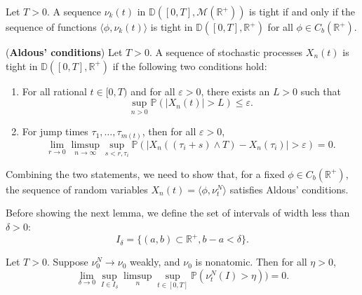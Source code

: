\begin{lem}\label{Cap}
Let $T>0$. A sequence $\nu_k(t)$ in $\mathbb D([0,T], \mathcal M(\mathbb{R}^+))$ is tight if and only if the sequence of functions $\langle \phi, \nu_k(t) \rangle$ is tight in $\mathbb D([0,T],\mathbb{R}^+)$ for all $\phi \in C_b(\mathbb R^+)$.
\end{lem}



\begin{theorem}\label{Ald}
 (\textbf{Aldous' conditions}) Let $T>0$. A sequence of stochastic processes $X_n(t)$ is tight in  $\mathbb D([0,T],\mathbb{R}^+)$ if the following two conditions hold:
\begin{enumerate}
\item For all rational $t \in [0,T)$ and for all $\varepsilon > 0$, there exists an $L>0$ such that
\begin{equation}
\sup_{n>0} \mathbb{P}(|X_n(t)|>L) \le \varepsilon.
\end{equation}
\item For jump times $\tau_1, \dots, \tau_{m(t)}$, then for all $\varepsilon >0$,
\begin{equation}
\lim_{r \rightarrow 0} \limsup_{n \rightarrow \infty} \sup_{s<r,\tau_{i}}  \mathbb P(|X_n((\tau_i+s) \wedge T) - X_n(\tau_i)| > \varepsilon) = 0.
\end{equation}
\end{enumerate}
\end{theorem} 

Combining the two statements, we need to show that, for a fixed $\phi \in C_b(\mathbb R^+),$ the sequence of random variables $X_n(t) = \langle \phi, \nu_t^N \rangle $ satisfies Aldous' conditions. 



Before showing the next lemma, we define the set of intervals of width less than $\delta>0$:
\begin{equation}
I_\delta = \{(a,b)\subset \mathbb{R}^+, b-a<\delta\}.
\end{equation}
\begin{lem}\label{tech} Let $T>0$.  Suppose $\nu_0^N \rightarrow \nu_0$ weakly, and $\nu_0$ is nonatomic. Then for all $\eta > 0$, 
\begin{equation}\label{paccon}
 \lim_{\delta \rightarrow 0} \sup_{I \in I_\delta}\limsup_n \sup_{t \in [0,T]}\mathbb P(\nu_t^N(I) >\eta)) = 0 .
\end{equation}
\end{lem}


